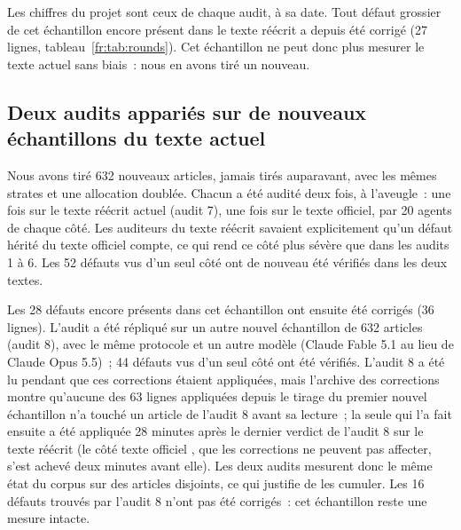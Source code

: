 \documentclass[11pt,a4paper]{article}
\begin{document}
Les chiffres du projet sont ceux de chaque audit, à sa date. Tout défaut grossier de cet échantillon encore présent dans le texte réécrit a depuis été corrigé (27 lignes, tableau~\ref{fr:tab:rounds}). Cet échantillon ne peut donc plus mesurer le texte actuel sans biais~: nous en avons tiré un nouveau.

\subsection{Deux audits appariés sur de nouveaux échantillons du texte actuel}
\label{fr:sec:fresh}

Nous avons tiré 632 nouveaux articles, jamais tirés auparavant, avec les mêmes strates et une allocation doublée. Chacun a été audité deux fois, à l'aveugle~: une fois sur le texte réécrit actuel (audit 7), une fois sur le texte officiel, par 20 agents de chaque côté. Les auditeurs du texte réécrit savaient explicitement qu'un défaut hérité du texte officiel compte, ce qui rend ce côté plus sévère que dans les audits 1 à 6. Les 52 défauts vus d'un seul côté ont de nouveau été vérifiés dans les deux textes.

Les 28 défauts encore présents dans cet échantillon ont ensuite été corrigés (36 lignes). L'audit a été répliqué sur un autre nouvel échantillon de 632 articles (audit 8), avec le même protocole et un autre modèle (Claude Fable 5.1 au lieu de Claude Opus 5.5)~; 44 défauts vus d'un seul côté ont été vérifiés. L'audit 8 a été lu pendant que ces corrections étaient appliquées, mais l'archive des corrections montre qu'aucune des 63 lignes appliquées depuis le tirage du premier nouvel échantillon n'a touché un article de l'audit 8 avant sa lecture~; la seule qui l'a fait ensuite a été appliquée 28 minutes après le dernier verdict de l'audit 8 sur le texte réécrit (le côté \og texte officiel \fg{}, que les corrections ne peuvent pas affecter, s'est achevé deux minutes avant elle). Les deux audits mesurent donc le même état du corpus sur des articles disjoints, ce qui justifie de les cumuler. Les 16 défauts trouvés par l'audit 8 n'ont pas été corrigés~: cet échantillon reste une mesure intacte.
\end{document}
